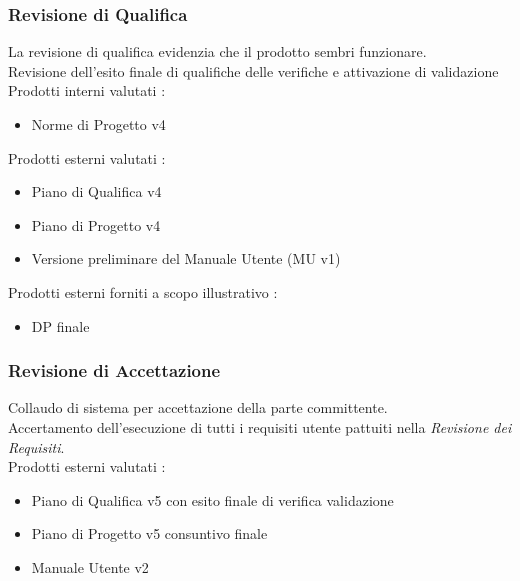 \documentclass[12pt,a4paper,titlepage]{article}
\begin{document}
	\subsubsection{Revisione di Qualifica}
	La revisione di qualifica  evidenzia che il prodotto sembri funzionare. \\
	Revisione dell'esito finale di qualifiche delle verifiche e attivazione di validazione \\
	Prodotti interni valutati :
	\begin{itemize}
		\item Norme di Progetto v4
	\end{itemize}
	Prodotti esterni valutati :
	\begin{itemize}
		\item Piano di Qualifica v4
		\item Piano di Progetto v4
		\item Versione preliminare del Manuale Utente (MU v1)
	\end{itemize}
	Prodotti esterni forniti a scopo illustrativo :
	\begin{itemize}
		\item DP finale
	\end{itemize}
	
	\subsubsection{Revisione di Accettazione}
	Collaudo di sistema per accettazione della parte committente.\\
	Accertamento dell'esecuzione di tutti i requisiti utente pattuiti nella \textit{Revisione dei Requisiti}.\\
	Prodotti esterni valutati :
	\begin{itemize}
		\item Piano di Qualifica v5 con esito finale di verifica validazione
		\item  Piano di Progetto v5 consuntivo finale
		\item Manuale Utente v2
	\end{itemize}
	
	\newpage
	
\end{document}
